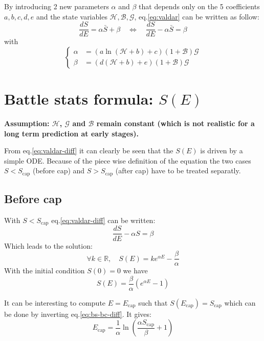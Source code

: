 \documentclass[12pt]{article}
\def\happy{\mathcal{H}}
\def\gym{\mathcal{G}}
\def\bonus{\mathcal{B}}
\def\Sc{S_\text{cap}}
\def\Ec{E_\text{cap}}
\begin{document}
\par By introducing 2 new parameters $\alpha$ and $\beta$ that depends only on the 5 coefficients $a, b, c, d, e$ and the state variables $\happy, \bonus, \gym$, eq.\eqref{eq:valdar} can be written as follow:
\begin{equation}
    \frac{dS}{dE} = \alpha \bar{S} + \beta \quad \Leftrightarrow \quad \frac{dS}{dE} - \alpha \bar{S} = \beta
    \label{eq:valdar-diff}
\end{equation}
with
\begin{equation}
    \left\{\begin{aligned}
        \alpha &= (a\ln(\happy+b)+c)(1+\bonus)\gym\\
        \beta &= (d(\happy+b) +e)(1+\bonus)\gym
    \end{aligned}\right.
\end{equation}

\section{Battle stats formula: $S(E)$}
\par {\color{myred}\bf Assumption: $\happy$, $\gym$ and $\bonus$ remain constant (which is not realistic for a long term prediction at early stages).}

\par From eq.\eqref{eq:valdar-diff} it can clearly be seen that the $S(E)$ is driven by a simple ODE. Because of the piece wise definition of the equation the two cases $S<\Sc$ (before cap) and $S>\Sc$ (after cap) have to be treated separatly.

\subsection{Before cap}
With $S<\Sc$ eq.\eqref{eq:valdar-diff} can be written:
\begin{equation}
    \frac{dS}{dE} -\alpha S = \beta
\end{equation}
Which leads to the solution:
\begin{equation}
    \forall k \in \mathbb{R},\quad S(E) = ke^{\alpha E} - \frac{\beta}{\alpha}
\end{equation}
With the initial condition $S(0)=0$ we have
\begin{equation}
    S(E) = \frac{\beta}{\alpha}\left(e^{\alpha E} - 1\right)
    \label{eq:bs-bc-diff}
\end{equation}

It can be interesting to compute $E=\Ec$ such that $S(\Ec)=\Sc$ which can be done by inverting eq.\eqref{eq:bs-bc-diff}. It gives:
\begin{equation}
    \Ec = \frac{1}{\alpha}\ln\left(\frac{\alpha \Sc}{\beta} +1 \right)
\end{equation}
\end{document}
